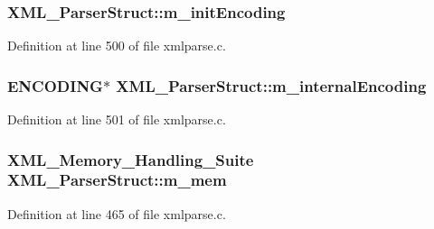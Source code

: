 \subsubsection[{\texorpdfstring{m\+\_\+init\+Encoding}{m_initEncoding}}]{ X\+M\+L\+\_\+\+Parser\+Struct\+::m\+\_\+init\+Encoding}\hypertarget{struct_x_m_l___parser_struct_ac5f81e324853ba558815bcbc5ac5c6f7}{}\label{struct_x_m_l___parser_struct_ac5f81e324853ba558815bcbc5ac5c6f7}


Definition at line 500 of file xmlparse.\+c.

\subsubsection[{\texorpdfstring{m\+\_\+internal\+Encoding}{m_internalEncoding}}]{ {\bf E\+N\+C\+O\+D\+I\+NG}$\ast$ X\+M\+L\+\_\+\+Parser\+Struct\+::m\+\_\+internal\+Encoding}\hypertarget{struct_x_m_l___parser_struct_a64b1a94069875e87dacb1f5576c01afc}{}\label{struct_x_m_l___parser_struct_a64b1a94069875e87dacb1f5576c01afc}


Definition at line 501 of file xmlparse.\+c.

\subsubsection[{\texorpdfstring{m\+\_\+mem}{m_mem}}]{ {\bf X\+M\+L\+\_\+\+Memory\+\_\+\+Handling\+\_\+\+Suite} X\+M\+L\+\_\+\+Parser\+Struct\+::m\+\_\+mem}\hypertarget{struct_x_m_l___parser_struct_a3d8cf0e7045f47319b423aebd7c1cf67}{}\label{struct_x_m_l___parser_struct_a3d8cf0e7045f47319b423aebd7c1cf67}


Definition at line 465 of file xmlparse.\+c.

